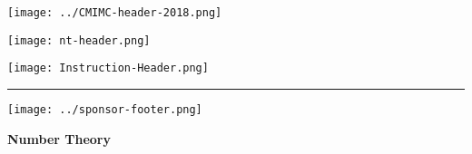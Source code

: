 \documentclass[10pt]{article}
\begin{document}
\thispagestyle{empty}
\begin{center}

\vspace*{40pt}

\texttt{[image: ../CMIMC-header-2018.png]}

\texttt{[image: nt-header.png]}

\vspace{1.4in}

\texttt{[image: Instruction-Header.png]}
\noindent\rule{15.7cm}{2pt}
\end{center}

\vspace{10pt}



\vspace{0.7in}

\begin{center}
\texttt{[image: ../sponsor-footer.png]}
\end{center}
\newpage

\begin{center}
\huge\textbf{Number Theory}\normalsize

\vspace{3pt}
\end{center}
\end{document}
